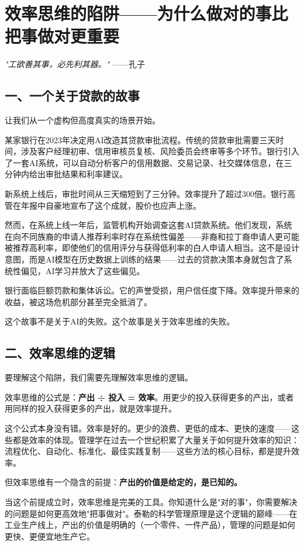 \chapter{效率思维的陷阱——为什么做对的事比把事做对更重要}


\textit{"工欲善其事，必先利其器。"}
——孔子


\section{一、一个关于贷款的故事}


让我们从一个虚构但高度真实的场景开始。

某家银行在2023年决定用AI改造其贷款审批流程。传统的贷款审批需要三天时间，涉及客户经理初审、信用审核员复核、风险委员会终审等多个环节。银行引入了一套AI系统，可以自动分析客户的信用数据、交易记录、社交媒体信息，在三分钟内给出审批结果和利率建议。

新系统上线后，审批时间从三天缩短到了三分钟。效率提升了超过300倍。银行高管在年报中自豪地宣布了这个成就，股价也应声上涨。

然而，在系统上线一年后，监管机构开始调查这套AI贷款系统。他们发现，系统在向不同族裔的申请人推荐利率时存在系统性偏差——非裔和拉丁裔申请人更可能被推荐高利率，即使他们的信用评分与获得低利率的白人申请人相当。这不是设计意图，而是AI模型在历史数据上训练的结果——过去的贷款决策本身就包含了系统性偏见，AI学习并放大了这些偏见。

银行面临巨额罚款和集体诉讼。它的声誉受损，用户信任度下降。效率提升带来的收益，被这场危机部分甚至完全抵消了。

这个故事不是关于AI的失败。这个故事是关于效率思维的失败。


\section{二、效率思维的逻辑}


要理解这个陷阱，我们需要先理解效率思维的逻辑。

效率思维的公式是：\textbf{产出 ÷ 投入 = 效率}。用更少的投入获得更多的产出，或者用同样的投入获得更多的产出，就是效率提升。

这个公式本身没有错。效率是好的。更少的浪费、更低的成本、更快的速度——这些都是效率的体现。管理学在过去一个世纪积累了大量关于如何提升效率的知识：流程优化、自动化、标准化、最佳实践复制——这些方法的核心目标，都是提升效率。

但效率思维有一个隐含的前提：\textbf{产出的价值是给定的，是已知的。}

当这个前提成立时，效率思维是完美的工具。你知道什么是"对的事"，你需要解决的问题是如何更高效地"把事做对"。泰勒的科学管理原理是这个逻辑的巅峰——在工业生产线上，产出的价值是明确的（一个零件、一件产品），管理的问题是如何更快、更便宜地生产它。

